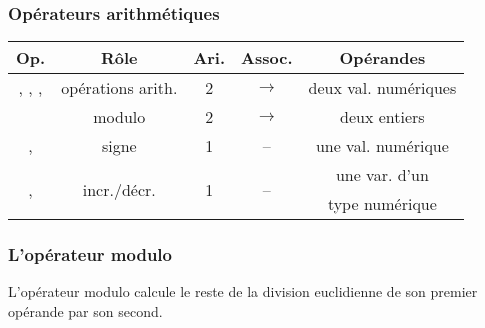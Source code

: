\begin{frame}[fragile]
\frametitle{Opérateurs arithmétiques}

\begin{center}
    \begin{tabular}{c|c|c|c|c}
        {\bf Op.} & {\bf Rôle} & {\bf Ari.} & {\bf Assoc.}
            & {\bf Opérandes} \\ \hline \hline
        \Code{+}, \Code{-}, \Code{*}, \Code{/} & opérations arith.
            & 2 & $\longrightarrow$ & deux val. numériques \\ \hline
        \Code{\%} & modulo & 2 & $\longrightarrow$ & deux entiers \\ \hline
        \Code{+}, \Code{-} & signe  & 1 & -- & une val. numérique \\ \hline
        \multirow{2}{*}{\Code{++}, \Code{-\,-}} &
            \multirow{2}{*}{incr./décr.} & \multirow{2}{*}{1} &
            \multirow{2}{*}{--} &
            une var. d'un \\
            & & & & type numérique
    \end{tabular}
\end{center}
\end{frame}

\begin{frame}[fragile]
\frametitle{L'opérateur modulo}
L'opérateur \alert{modulo} \Code{\%} calcule le reste de la division
euclidienne de son premier opérande par son second.
\medskip



\begin{semiverbatim}\small{}
\end{semiverbatim}
\end{frame}

